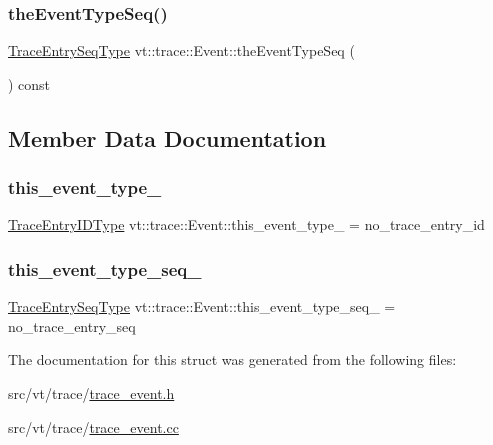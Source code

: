 \mbox{\label{structvt_1_1trace_1_1_event_a8479476d6d9a816d78d0a341df438626}} 
\subsubsection{\texorpdfstring{the\+Event\+Type\+Seq()}{theEventTypeSeq()}}
{\footnotesize\ttfamily \hyperlink{namespacevt_1_1trace_a522028dd2a7d056f0ec3d417836fdecd}{Trace\+Entry\+Seq\+Type} vt\+::trace\+::\+Event\+::the\+Event\+Type\+Seq (\begin{DoxyParamCaption}{ }\end{DoxyParamCaption}) const}



\subsection{Member Data Documentation}
\mbox{\label{structvt_1_1trace_1_1_event_a51ce0a1bf8edd079479273d794a9820b}} 
\subsubsection{\texorpdfstring{this\+\_\+event\+\_\+type\+\_\+}{this\_event\_type\_}}
{\footnotesize\ttfamily \hyperlink{namespacevt_1_1trace_a3c14050715ba9eceaeff51fb3de64f2f}{Trace\+Entry\+I\+D\+Type} vt\+::trace\+::\+Event\+::this\+\_\+event\+\_\+type\+\_\+ = no\+\_\+trace\+\_\+entry\+\_\+id\hspace{0.3cm}{\ttfamily [private]}}

\mbox{\label{structvt_1_1trace_1_1_event_a915f6b615f2c1ff3dc1e673603a5e0a0}} 
\subsubsection{\texorpdfstring{this\+\_\+event\+\_\+type\+\_\+seq\+\_\+}{this\_event\_type\_seq\_}}
{\footnotesize\ttfamily \hyperlink{namespacevt_1_1trace_a522028dd2a7d056f0ec3d417836fdecd}{Trace\+Entry\+Seq\+Type} vt\+::trace\+::\+Event\+::this\+\_\+event\+\_\+type\+\_\+seq\+\_\+ = no\+\_\+trace\+\_\+entry\+\_\+seq\hspace{0.3cm}{\ttfamily [private]}}



The documentation for this struct was generated from the following files\+:\begin{DoxyCompactItemize}
\item 
src/vt/trace/\hyperlink{trace__event_8h}{trace\+\_\+event.\+h}\item 
src/vt/trace/\hyperlink{trace__event_8cc}{trace\+\_\+event.\+cc}\end{DoxyCompactItemize}
